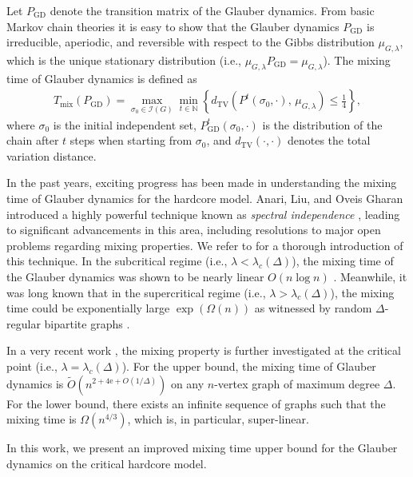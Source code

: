 \documentclass[11pt]{article}
\theoremstyle{plain}
\theoremstyle{definition}
\theoremstyle{remark}
\newcommand{\TV}[2]{d_{\mathrm{TV}}\left(#1,\, #2\right)}
\newcommand{\N}{\mathbb{N}}
\newcommand{\II}{\mathcal{I}}
\newcommand{\e}{\mathrm{e}}
\begin{document}
Let $P_{\mathrm{GD}}$ denote the transition matrix of the Glauber dynamics.
From basic Markov chain theories it is easy to show that the Glauber dynamics $P_{\mathrm{GD}}$ is irreducible, aperiodic, and reversible with respect to the Gibbs distribution $\mu_{G,\lambda}$, which is the unique stationary distribution (i.e., $\mu_{G,\lambda} P_{\mathrm{GD}} = \mu_{G,\lambda}$).
The mixing time of Glauber dynamics is defined as
\begin{align*}
	T_{\mathrm{mix}}(P_{\mathrm{GD}}) = \max_{\sigma_0 \in \II(G)} \min_{t \in \N} \left\{ \TV{P^t(\sigma_0, \cdot)}{\mu_{G,\lambda}} \le \frac{1}{4} \right\},
\end{align*}
where $\sigma_0$ is the initial independent set, $P_{\mathrm{GD}}^t(\sigma_0, \cdot)$ is the distribution of the chain after $t$ steps when starting from $\sigma_0$, and $d_{\mathrm{TV}}(\cdot,\cdot)$ denotes the total variation distance.


In the past years, exciting progress has been made in understanding the mixing time of Glauber dynamics for the hardcore model. 
Anari, Liu, and Oveis Gharan introduced a highly powerful technique known as \emph{spectral independence} \cite{anari2020spectral}, leading to significant advancements in this area, including resolutions to major open problems regarding mixing properties.
We refer to \cite{liu2023spectral,stefankovic2023lecture} for a thorough introduction of this technique.
In the subcritical regime (i.e., $\lambda < \lambda_c(\Delta)$), the mixing time of the Glauber dynamics was shown to be nearly linear $O(n \log n)$ \cite{anari2020spectral,chen2021optimal,CFYZ22optimal,chen2022localization}. 
Meanwhile, it was long known that in the supercritical regime (i.e., $\lambda > \lambda_c(\Delta)$), the mixing time could be exponentially large $\exp(\Omega(n))$ as witnessed by random $\Delta$-regular bipartite graphs \cite{mossel2009hardness}.

In a very recent work \cite{CCYZ24}, the mixing property is further investigated at the critical point (i.e., $\lambda = \lambda_c(\Delta)$).
For the upper bound, the mixing time of Glauber dynamics is $\tilde{O}(n^{2+4\e+O(1/\Delta)})$ on any $n$-vertex graph of maximum degree $\Delta$. 
For the lower bound, there exists an infinite sequence of graphs such that the mixing time is $\Omega(n^{4/3})$, which is, in particular, super-linear. 

In this work, we present an improved mixing time upper bound for the Glauber dynamics on the critical hardcore model.
\end{document}
